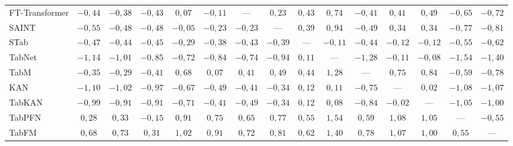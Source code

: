 \begin{table}[htbp]
\begin{tabular}{lcccccccccccccc}
FT-Transformer & $-0{,}44$ & $-0{,}38$ & $-0{,}43$ & $0{,}07$ & $-0{,}11$ & --- & $0{,}23$ & $0{,}43$ & $0{,}74$ & $-0{,}41$ & $0{,}41$ & $0{,}49$ & $-0{,}65$ & $-0{,}72$ \\
SAINT & $-0{,}55$ & $-0{,}48$ & $-0{,}48$ & $-0{,}05$ & $-0{,}23$ & $-0{,}23$ & --- & $0{,}39$ & $0{,}94$ & $-0{,}49$ & $0{,}34$ & $0{,}34$ & $-0{,}77$ & $-0{,}81$ \\
STab & $-0{,}47$ & $-0{,}44$ & $-0{,}45$ & $-0{,}29$ & $-0{,}38$ & $-0{,}43$ & $-0{,}39$ & --- & $-0{,}11$ & $-0{,}44$ & $-0{,}12$ & $-0{,}12$ & $-0{,}55$ & $-0{,}62$ \\
TabNet & $-1{,}14$ & $-1{,}01$ & $-0{,}85$ & $-0{,}72$ & $-0{,}84$ & $-0{,}74$ & $-0{,}94$ & $0{,}11$ & --- & $-1{,}28$ & $-0{,}11$ & $-0{,}08$ & $-1{,}54$ & $-1{,}40$ \\
TabM & $-0{,}35$ & $-0{,}29$ & $-0{,}41$ & $0{,}68$ & $0{,}07$ & $0{,}41$ & $0{,}49$ & $0{,}44$ & $1{,}28$ & --- & $0{,}75$ & $0{,}84$ & $-0{,}59$ & $-0{,}78$ \\
KAN & $-1{,}10$ & $-1{,}02$ & $-0{,}97$ & $-0{,}67$ & $-0{,}49$ & $-0{,}41$ & $-0{,}34$ & $0{,}12$ & $0{,}11$ & $-0{,}75$ & --- & $0{,}02$ & $-1{,}08$ & $-1{,}07$ \\
TabKAN & $-0{,}99$ & $-0{,}91$ & $-0{,}91$ & $-0{,}71$ & $-0{,}41$ & $-0{,}49$ & $-0{,}34$ & $0{,}12$ & $0{,}08$ & $-0{,}84$ & $-0{,}02$ & --- & $-1{,}05$ & $-1{,}00$ \\
TabPFN & $0{,}28$ & $0{,}33$ & $-0{,}15$ & $0{,}91$ & $0{,}75$ & $0{,}65$ & $0{,}77$ & $0{,}55$ & $1{,}54$ & $0{,}59$ & $1{,}08$ & $1{,}05$ & --- & $-0{,}55$ \\
TabFM & $0{,}68$ & $0{,}73$ & $0{,}31$ & $1{,}02$ & $0{,}91$ & $0{,}72$ & $0{,}81$ & $0{,}62$ & $1{,}40$ & $0{,}78$ & $1{,}07$ & $1{,}00$ & $0{,}55$ & --- \\
\bottomrule
\end{tabular}
\end{table}

